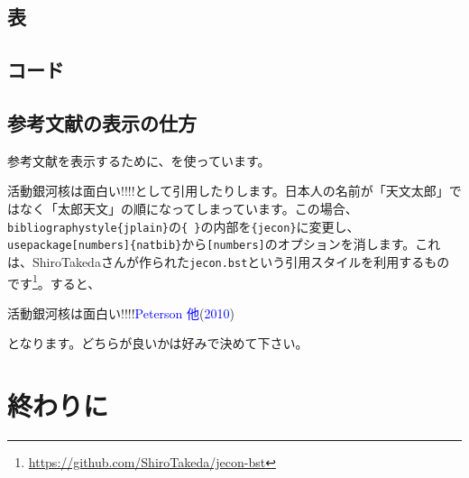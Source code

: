 \documentclass[a4paper,papersize,uplatex,dvipdfmx,10pt]{jsarticle}
\newcommand{\bs}{\symbol{92}} %
\newcommand{\blue}[1]{\textcolor{blue}{#1}} %
\begin{document}
\subsection{表} %

\subsection{コード} %

\subsection{参考文献の表示の仕方}
参考文献を表示するために、\BibTeX を使っています。\par
活動銀河核は面白い!!!!\cite{1130000796831041920}として引用したりします。日本人の名前が「天文太郎」ではなく「太郎天文」の順になってしまっています。この場合、\texttt{\bs bibliographystyle\{jplain\}}の\texttt{\{ \}}の内部を\texttt{\{jecon\}}に変更し、\texttt{\bs usepackage[numbers]\{natbib\}}から\texttt{[numbers]}のオプションを消します。これは、ShiroTakedaさんが作られた\texttt{jecon.bst}という引用スタイルを利用するものです\footnote{\url{https://github.com/ShiroTakeda/jecon-bst}}。すると、
\begin{screen}
  活動銀河核は面白い!!!!\blue{Peterson 他}(\blue{2010})
\end{screen}
となります。どちらが良いかは好みで決めて下さい。

\section{終わりに} %

\renewcommand{\bibname}{参考文献}
%


\end{document}
